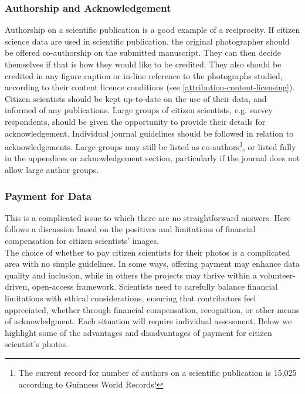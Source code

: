 \documentclass{article}
\newcommand{\contributed}[1]{%
    \par\noindent
    \begingroup
    \setlength{\leftskip}{1em}%
    \itshape
    Contributors: #1
    \par
    \endgroup
    \vspace{0.5em}
}
\begin{document}
\subsubsection{Authorship and Acknowledgement}\label{authorship-and-acknowledgement}
Authorship on a scientific publication is a good example of a reciprocity. If citizen science data are used in scientific publication, the original photographer should be offered co-authorship on the submitted manuscript. They can then decide themselves if that is how they would like to be credited. They also should be credited in any figure caption or in-line reference to the photographs studied, according to their content licence conditions (see \ref{attribution-content-licensing}). \\ 

Citizen scientists should be kept up-to-date on the use of their data, and informed of any publications. Large groups of citizen scientists, e.g. survey respondents, should be given the opportunity to provide their details for acknowledgement. Individual journal guidelines should be followed in relation to acknowledgements. Large groups may still be listed as co-authors\footnote{The current record for number of authors on a scientific publication is 15,025 according to Guinness World Records!}, or listed fully in the appendices or acknowledgement section, particularly if the journal does not allow large author groups. \\

\subsubsection{Payment for Data}\label{payment-for-data}


This is a complicated issue to which there are no straightforward answers. Here follows a discussion based on the positives and limitations of financial compensation for citizen scientists' images.\\

The choice of whether to pay citizen scientists for their photos is a complicated area with no simple guidelines. In some ways, offering payment may enhance data quality and inclusion, while in others the projects may thrive within a volunteer-driven, open-access framework. Scientists need to carefully balance financial limitations with ethical considerations, ensuring that contributors feel appreciated, whether through financial compensation, recognition, or other means of acknowledgment. Each situation will require individual assessment. Below we highlight some of the advantages and disadvantages of payment for citizen scientist's photos.\\
\end{document}
